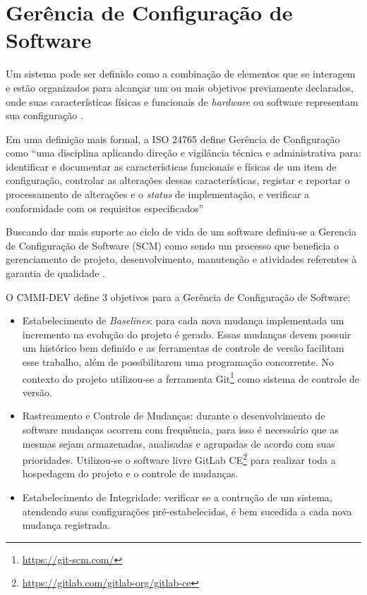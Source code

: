 \chapter{Gerência de Configuração de Software}
Um sistema pode ser definido como a combinação de elementos que se interagem e estão organizados para alcançar um ou mais objetivos previamente declarados, onde suas características físicas e funcionais de \textit{hardware} ou software representam sua configuração \cite{SWEBOK2014}.

Em uma definição mais formal, a ISO 24765 \cite{iso_24765} define Gerência de Configuração como ``uma disciplina aplicando direção e vigilância técnica e administrativa para: identificar e documentar as características funcionais e físicas de um item de configuração, controlar as alterações dessas características, registar e reportar o processamento de alterações e o \textit{status} de implementação, e verificar a conformidade com os requisitos especificados''

Buscando dar mais suporte ao ciclo de vida de um software definiu-se a Gerencia de Configuração de Software (SCM) como sendo um processo que beneficia o gerenciamento de projeto, desenvolvimento, manutenção e atividades referentes à garantia de qualidade \cite{SWEBOK2014}.

O CMMI-DEV \cite{cmmi_dev} define 3 objetivos para a Gerência de Configuração de Software:
\begin{itemize}
    \item Estabelecimento de \textit{Baselines}: para cada nova mudança implementada um incremento na evolução do projeto é gerado. Essas mudanças devem possuir um histórico bem definido e as ferramentas de controle de versão facilitam esse trabalho, além de possibilitarem uma programação concorrente. No contexto do projeto utilizou-se a ferramenta Git\footnote{\url{https://git-scm.com/}} como sistema de controle de versão.
    \item Rastreamento e Controle de Mudanças: durante o desenvolvimento de software mudanças ocorrem com frequência, para isso é necessário que as mesmas sejam armazenadas, analisadas e agrupadas de acordo com suas prioridades. Utilizou-se o software livre GitLab CE\footnote{\url{https://gitlab.com/gitlab-org/gitlab-ce}} para realizar toda a hospedagem do projeto e o controle de mudanças.
    \item Estabelecimento de Integridade: verificar se a contrução de um sistema, atendendo suas configurações pré-estabelecidas, é bem sucedida a cada nova mudança registrada.
\end{itemize}